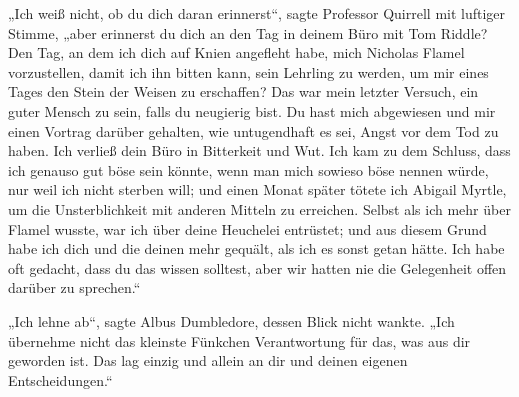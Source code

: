 „Ich weiß nicht, ob du dich daran erinnerst“, sagte Professor Quirrell mit luftiger Stimme, „aber erinnerst du dich an den Tag in deinem Büro mit Tom Riddle? Den Tag, an dem ich dich auf Knien angefleht habe, mich Nicholas Flamel vorzustellen, damit ich ihn bitten kann, sein Lehrling zu werden, um mir eines Tages den Stein der Weisen zu erschaffen? Das war mein letzter Versuch, ein guter Mensch zu sein, falls du neugierig bist. Du hast mich abgewiesen und mir einen Vortrag darüber gehalten, wie untugendhaft es sei, Angst vor dem Tod zu haben. Ich verließ dein Büro in Bitterkeit und Wut. Ich kam zu dem Schluss, dass ich genauso gut böse sein könnte, wenn man mich sowieso böse nennen würde, nur weil ich nicht sterben will; und einen Monat später tötete ich Abigail Myrtle, um die Unsterblichkeit mit anderen Mitteln zu erreichen. Selbst als ich mehr über Flamel wusste, war ich über deine Heuchelei entrüstet; und aus diesem Grund habe ich dich und die deinen mehr gequält, als ich es sonst getan hätte. Ich habe oft gedacht, dass du das wissen solltest, aber wir hatten nie die Gelegenheit offen darüber zu sprechen.“

„Ich lehne ab“, sagte Albus Dumbledore, dessen Blick nicht wankte.
„Ich übernehme nicht das kleinste Fünkchen Verantwortung für das, was aus dir geworden ist. Das lag einzig und allein an dir und deinen eigenen Entscheidungen.“

